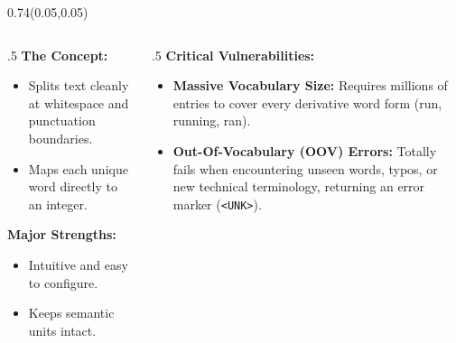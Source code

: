 \documentclass[aspectratio=169]{beamer}
\begin{document}
	\begin{frame}{}
		\setlength{\TPHorizModule}{\textwidth}
		\setlength{\TPVertModule}{\textwidth}
		\begin{textblock}{0.74}(0.05,0.05)
			\bfseries\large{}
		\end{textblock}
		
		\vspace{2em}
		\begin{columns}
			\begin{column}{.5\textwidth}
				\textbf{The Concept:}
				\begin{itemize}
					\item Splits text cleanly at whitespace and punctuation boundaries.
					\item Maps each unique word directly to an integer.
				\end{itemize}
				\vspace{0.5em}
				\textbf{Major Strengths:}
				\begin{itemize}
					\item Intuitive and easy to configure.
					\item Keeps semantic units intact.
				\end{itemize}
			\end{column}
			\begin{column}{.5\textwidth}
				\textbf{Critical Vulnerabilities:}
				\begin{itemize}
					\item \textbf{Massive Vocabulary Size:} Requires millions of entries to cover every derivative word form (run, running, ran).
					\item \textbf{Out-Of-Vocabulary (OOV) Errors:} Totally fails when encountering unseen words, typos, or new technical terminology, returning an error marker (\texttt{<UNK>}).
				\end{itemize}
			\end{column}
		\end{columns}
	\end{frame}
	
\end{document}
